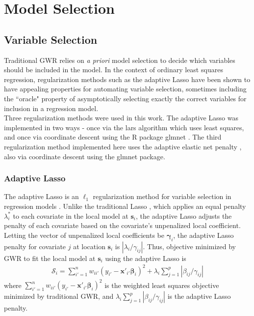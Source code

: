 \documentclass[authoryear, review, 11pt]{elsarticle}
\begin{document}
	
	 
	
\section{Model Selection \label{section:model-selection}}
	\subsection{Variable Selection}	
	Traditional GWR relies on \emph{a priori} model selection to decide which variables should be included in the model. In the context of ordinary least squares regression, regularization methods such as the adaptive Lasso \citep{Zou:2006} have been shown to have appealing properties for automating variable selection, sometimes including the ``oracle" property of asymptotically selecting exactly the correct variables for inclusion in a regression model.\\
	
	Three regularization methods were used in this work. The adaptive Lasso was implemented in two ways - once via the lars algorithm \citep{Efron:2004b} which uses least squares, and once via coordinate descent using the R package glmnet \citep{Friedman:2010}. The third regularization method implemented here uses the adaptive elastic net penalty \citep{Zou:2009}, also via coordinate descent using the glmnet package.
	
	\subsubsection{Adaptive Lasso}
	The adaptive Lasso is an $\ell_1$ regularization method for variable selection in regression models \citep{Zou:2006}. Unlike the traditional Lasso \citep{Tibshirani:1996}, which applies an equal penalty $\lambda^*_i$ to each covariate in the local model at $\bm{s}_i$, the adaptive Lasso adjusts the penalty of each covariate based on the covariate's unpenalized local coefficient. Letting the vector of unpenalized local coefficients be $\bm{\gamma}_i$, the adaptive Lasso penalty for covariate $j$ at location $\bm{s}_i$ is $|\lambda_i / \gamma_{ij}|$. Thus, objective minimized by GWR to fit the local model at $\bm{s}_i$ using the adaptive Lasso is
	\begin{align}\label{eq:adaptive-lasso-WLS}
		\mathcal{S}_i = \sum_{i'=1}^n w_{ii'} \left(y_{i'} - \bm{x}'_{i'} \bm{\beta}_i \right)^2 +  \lambda_i \sum_{j=1}^p |\beta_{ij} / \gamma_{ij}|
	\end{align}
	where $\sum_{i'=1}^n w_{ii'} \left(y_{i'} - \bm{x}'_{i'} \bm{\beta}_i \right)^2$ is the weighted least squares objective minimized by traditional GWR, and $\lambda_i \sum_{j=1}^p |\beta_{ij} / \gamma_{ij}|$ is the adaptive Lasso penalty.
	
\end{document}
